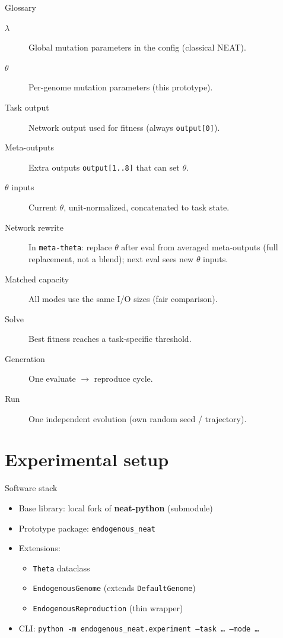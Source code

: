 \documentclass[aspectratio=169,11pt]{beamer}
\begin{document}
\begin{frame}{Glossary}
  \begin{description}
    \item[$\lambda$] Global mutation parameters in the config (classical NEAT).
    \item[$\theta$] Per-genome mutation parameters (this prototype).
    \item[Task output] Network output used for fitness (always \texttt{output[0]}).
    \item[Meta-outputs] Extra outputs \texttt{output[1..8]} that can set $\theta$.
    \item[$\theta$ inputs] Current $\theta$, unit-normalized, concatenated to task state.
    \item[Network rewrite] In \texttt{meta-theta}: replace $\theta$ after eval from
      averaged meta-outputs (full replacement, not a blend); next eval sees new $\theta$ inputs.
    \item[Matched capacity] All modes use the same I/O sizes (fair comparison).
    \item[Solve] Best fitness reaches a task-specific threshold.
    \item[Generation] One evaluate $\rightarrow$ reproduce cycle.
    \item[Run] One independent evolution (own random seed / trajectory).
  \end{description}
\end{frame}

\section{Experimental setup}

\begin{frame}{Software stack}
  \begin{itemize}
    \item Base library: local fork of \textbf{neat-python} (submodule)
    \item Prototype package: \texttt{endogenous\_neat}
    \item Extensions:
      \begin{itemize}
        \item \texttt{Theta} dataclass
        \item \texttt{EndogenousGenome} (extends \texttt{DefaultGenome})
        \item \texttt{EndogenousReproduction} (thin wrapper)
      \end{itemize}
    \item CLI: \texttt{python -m endogenous\_neat.experiment --task \ldots\ --mode \ldots}
  \end{itemize}
\end{frame}
\end{document}
